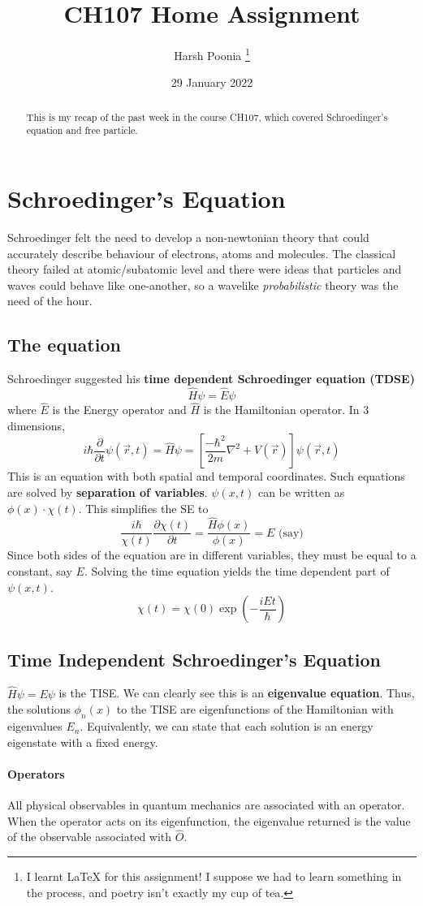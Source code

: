 \documentclass[12pt]{article}
\title{CH107 Home Assignment}
\author{Harsh Poonia \thanks{I learnt \LaTeX{} for this assignment! I suppose we had to learn something in the process, and poetry isn't exactly my cup of tea.}}
\date{29 January 2022}
\begin{document}
\maketitle
\begin{abstract}
This is my recap of the past week in the course CH107, which covered Schroedinger's equation and free particle.
\end{abstract}
\section{Schroedinger's Equation}
Schroedinger felt the need to develop a non-newtonian theory that could accurately describe behaviour of electrons, atoms and molecules. The classical theory failed at atomic/subatomic level and there were ideas that particles and waves could behave like one-another, so a wavelike \emph{probabilistic} theory was the need of the hour. 
\subsection*{The equation}
Schroedinger suggested his \textbf{time dependent Schroedinger equation (TDSE)}
\[\hat{H}\psi=\hat{E}\psi\]
where $\hat{E}$ is the Energy operator and $\hat{H}$ is the Hamiltonian operator. In 3 dimensions, 
\[i\hbar \frac{\partial}{\partial t}\psi(\vec{r}, t)=\hat{H}\psi = \left[ \frac{-\hbar^2}{2m} \nabla^2 + V(\vec{r}) \right] \psi(\vec{r}, t)\]
This is an equation with both spatial and temporal coordinates. Such equations are solved by \textbf{separation of variables}. $\psi(x, t)$ can be written as $\phi(x)\cdot \chi (t)$.
This simplifies the SE to 
\[\frac{i\hbar}{\chi (t)}\frac{\partial \chi(t)}{\partial t}=\frac{\hat{H}\phi(x)}{\phi(x)} = E \textrm{ (say)}\]
Since both sides of the equation are in different variables, they must be equal to a constant, say $E$. Solving the time equation yields the time dependent part of $\psi(x, t)$.
\[\chi(t)=\chi(0)\exp{\left( -\frac{iEt}{\hbar} \right)}\]
\subsection*{Time Independent Schroedinger's Equation}
$\hat{H}\psi = E\psi$ is the TISE. We can clearly see this is an \textbf{eigenvalue equation}. Thus, the solutions $\phi_n(x)$ to the TISE are eigenfunctions of the Hamiltonian with eigenvalues $E_n$. Equivalently, we can state that each solution is an energy eigenstate with a fixed energy.
\paragraph{Operators}
All physical observables in quantum mechanics are associated with an operator. When the operator acts on its eigenfunction, the eigenvalue returned is the value of the observable associated with $\hat{O}$.
\end{document}
